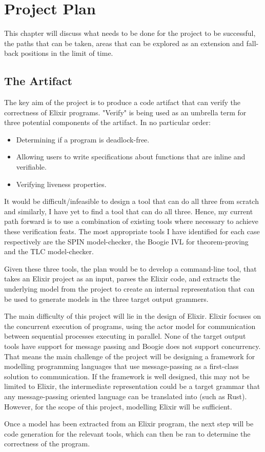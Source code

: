 \chapter{Project Plan}
This chapter will discuss what needs to be done for the project to be successful, the paths that can be taken, areas that can be explored as an extension and fall-back positions in the limit of time.
\par
\section{The Artifact}
The key aim of the project is to produce a code artifact that can verify the correctness of Elixir programs. "Verify" is being used as an umbrella term for three potential components of the artifact. In no particular order:
\begin{itemize}
    \item Determining if a program is deadlock-free.
    \item Allowing users to write specifications about functions that are inline and verifiable.
    \item Verifying liveness properties. 
\end{itemize}
It would be difficult/infeasible to design a tool that can do all three from scratch and similarly, I have yet to find a tool that can do all three. Hence, my current path forward is to use a combination of existing tools where necessary to achieve these verification feats. The most appropriate tools I have identified for each case respectively are the SPIN model-checker, the Boogie IVL for theorem-proving and the TLC model-checker.
\par
Given these three tools, the plan would be to develop a command-line tool, that takes an Elixir project as an input, parses the Elixir code, and extracts the underlying model from the project to create an internal representation that can be used to generate models in the three target output grammers.
\par
The main difficulty of this project will lie in the design of Elixir. Elixir focuses on the concurrent execution of programs, using the actor model for communication between sequential processes executing in parallel. None of the target output tools have support for message passing and Boogie does not support concurrency. That means the main challenge of the project will be designing a framework for modelling programming languages that use message-passing as a first-class solution to communication. If the framework is well designed, this may not be limited to Elixir, the intermediate representation could be a target grammar that any message-passing oriented language can be translated into (such as Rust). However, for the scope of this project, modelling Elixir will be sufficient.
\par
Once a model has been extracted from an Elixir program, the next step will be code generation for the relevant tools, which can then be ran to determine the correctness of the program.
